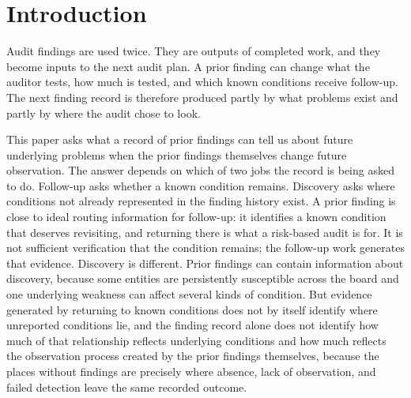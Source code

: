 \section{Introduction}\label{sec:intro}

Audit findings are used twice. They are outputs of completed work, and they
become inputs to the next audit plan. A prior finding can change what the
auditor tests, how much is tested, and which known conditions receive
follow-up. The next finding record is therefore produced partly by what
problems exist and partly by where the audit chose to look.

This paper asks what a record of prior findings can tell us about future
underlying problems when the prior findings themselves change future
observation. The answer depends on which of two jobs the record is being asked
to do. Follow-up asks whether a known condition remains. Discovery asks where
conditions not already represented in the finding history exist. A prior
finding is close to ideal routing information for follow-up: it identifies a
known condition that deserves revisiting, and returning there is what a
risk-based audit is for. It is not sufficient verification that the
condition remains; the follow-up work generates that evidence. Discovery is different. Prior
findings can contain information about discovery, because some entities are
persistently susceptible across the board and one underlying weakness can
affect several kinds of condition. But evidence generated by returning to
known conditions does not by itself identify where unreported conditions lie,
and the finding record alone does not identify how much of that relationship
reflects underlying conditions and how much reflects the observation process
created by the prior findings themselves, because the places without findings
are precisely where absence, lack of observation, and failed detection leave
the same recorded outcome.

